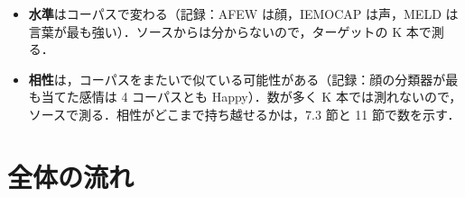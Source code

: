 \documentclass[a4paper,11pt]{ltjsarticle}
\begin{document}
\begin{itemize}
  \item \textbf{水準}はコーパスで変わる（記録：AFEW は顔，IEMOCAP は声，MELD は言葉が最も強い）．ソースからは分からないので，ターゲットの K 本で測る．
  \item \textbf{相性}は，コーパスをまたいで似ている可能性がある（記録：顔の分類器が最も当てた感情は 4 コーパスとも Happy）．数が多く K 本では測れないので，ソースで測る．相性がどこまで持ち越せるかは，7.3 節と 11 節で数を示す．
\end{itemize}

\section{全体の流れ}
\end{document}
